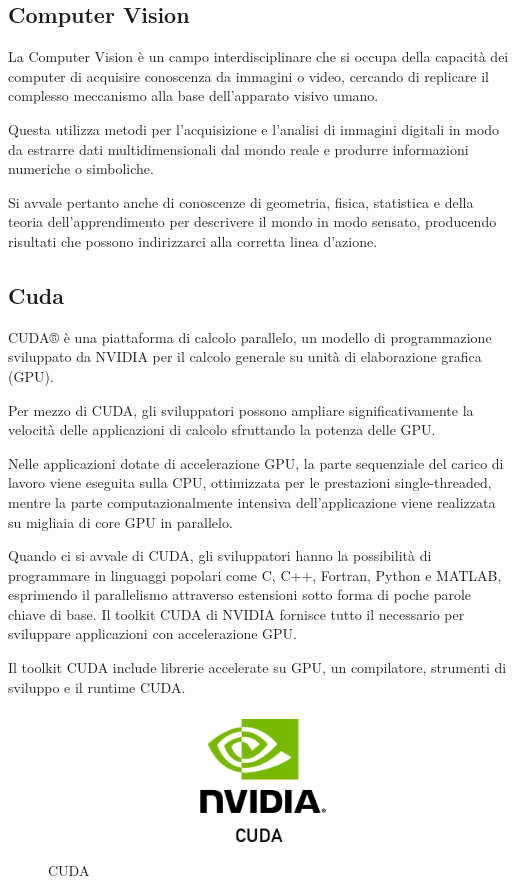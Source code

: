 \subsection{Computer Vision}
La Computer Vision è un campo interdisciplinare che si occupa della capacità dei computer di acquisire conoscenza da immagini o video, cercando di replicare il complesso meccanismo alla base dell'apparato visivo umano. 

Questa utilizza metodi per l'acquisizione e l'analisi di immagini digitali in modo da estrarre dati multidimensionali dal mondo reale e produrre informazioni numeriche o simboliche. 

Si avvale pertanto anche di conoscenze di geometria, fisica, statistica e della teoria dell'apprendimento per descrivere il mondo in modo sensato, producendo risultati che possono indirizzarci alla corretta linea d'azione.

\subsection{Cuda} 
CUDA® \cite{CUDA} è una piattaforma di calcolo parallelo, un modello di programmazione sviluppato da NVIDIA per il calcolo generale su unità di elaborazione grafica (GPU). 

Per mezzo di CUDA, gli sviluppatori possono ampliare significativamente la velocità delle applicazioni di calcolo sfruttando la potenza delle GPU.

Nelle applicazioni dotate di accelerazione GPU, la parte sequenziale del carico di lavoro viene eseguita sulla CPU, ottimizzata per le prestazioni single-threaded, mentre la parte computazionalmente intensiva dell’applicazione viene realizzata su migliaia di core GPU in parallelo. 

Quando ci si avvale di CUDA, gli sviluppatori hanno la possibilità di programmare in linguaggi popolari come C, C++, Fortran, Python e MATLAB, esprimendo il parallelismo attraverso estensioni sotto forma di poche parole chiave di base.
Il toolkit CUDA di NVIDIA fornisce tutto il necessario per sviluppare applicazioni con accelerazione GPU.

Il toolkit CUDA include librerie accelerate su GPU, un compilatore, strumenti di sviluppo e il runtime CUDA.

\begin{figure}
    \begin{center}    
        \includegraphics[width=0.9\linewidth]{images/image1.png}
        \caption{CUDA}
    \end{center}
\end{figure}

